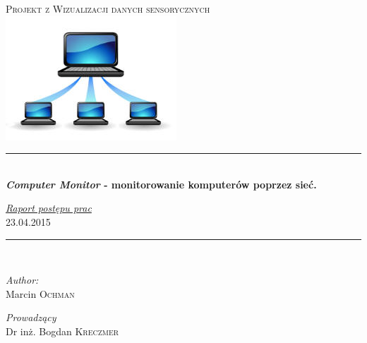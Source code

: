 \begin{titlepage}
\begin{center}

 \newcommand{\HRule}{\rule{\linewidth}{0.5mm}}

\textsc{\Large Projekt z Wizualizacji danych sensorycznych}\\[1cm]

\includegraphics{network_icon}


\HRule \\[0.4cm]
{ \huge \bfseries \textit{Computer Monitor} - monitorowanie komputerów poprzez sieć.\\[0.4cm] }

{\huge \underline{\textit{Raport postępu prac }}}\\[0.5cm]


\LARGE 23.04.2015
\HRule \\[1.5cm]


\noindent
\begin{minipage}[t]{0.4\textwidth}
\begin{flushleft} \large
\emph{Author:}\\
Marcin \textsc{Ochman}
\end{flushleft}
\end{minipage}%
\begin{minipage}[t]{0.4\textwidth}
\begin{flushright} \large
\emph{Prowadzący} \\
Dr inż. Bogdan \textsc{Kreczmer}
\end{flushright}
\end{minipage}


\end{center}
\end{titlepage}